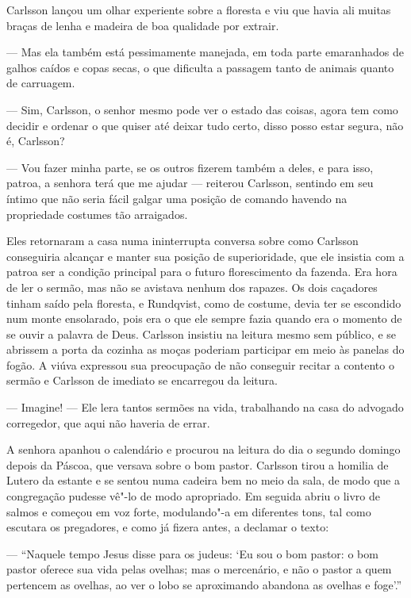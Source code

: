 Carlsson lançou um olhar experiente sobre a floresta e viu que havia ali muitas
braças de lenha e madeira de boa qualidade por extrair.

--- Mas ela também está pessimamente manejada, em toda parte
emaranhados de galhos caídos e copas secas, o que dificulta a passagem tanto
de animais quanto de carruagem.

--- Sim, Carlsson, o senhor mesmo pode ver o estado das coisas, agora tem como
decidir e ordenar o que quiser até deixar tudo certo, disso posso estar segura,
não é, Carlsson?

--- Vou fazer minha parte, se os outros fizerem também a deles, e para isso, patroa, a senhora
terá que me ajudar --- reiterou Carlsson, sentindo em seu íntimo que não seria
fácil galgar uma posição de comando havendo na propriedade costumes tão
arraigados.

Eles retornaram a casa numa ininterrupta conversa sobre como Carlsson conseguiria
alcançar e manter sua posição de superioridade, que ele insistia com a patroa
ser a condição principal para o futuro florescimento da fazenda. Era hora de
ler o sermão, mas não se avistava nenhum dos rapazes. Os dois caçadores tinham
saído pela floresta, e Rundqvist, como de costume, devia ter se escondido num
monte ensolarado, pois era o que ele sempre fazia quando era o momento de se ouvir a palavra
de Deus. Carlsson insistiu na leitura mesmo sem público, e se abrissem a porta
da cozinha as moças poderiam participar em meio às panelas do fogão. A viúva
expressou sua preocupação de não conseguir recitar a contento o sermão e
Carlsson de imediato se encarregou da leitura.

--- Imagine! --- Ele lera tantos sermões na vida, trabalhando na casa do
advogado corregedor, que aqui não haveria de errar.

A senhora apanhou o calendário e procurou na leitura do dia o segundo domingo
depois da Páscoa, que versava sobre o bom pastor. Carlsson tirou a homilia de
Lutero da estante e se sentou numa cadeira bem no meio da sala, de modo que a
congregação pudesse vê"-lo de modo apropriado. Em seguida abriu o livro de salmos e
começou em voz forte, modulando"-a em diferentes tons, tal como escutara os
pregadores, e como já fizera antes, a declamar o texto:

--- ``Naquele tempo Jesus disse para os judeus: `Eu sou o bom pastor: o bom pastor
oferece sua vida pelas ovelhas; mas o mercenário, e não o pastor a quem
pertencem as ovelhas, ao ver o lobo se aproximando abandona as ovelhas e
foge'.''

